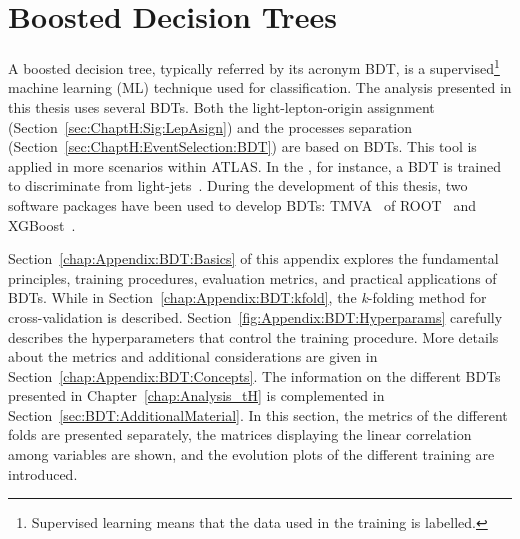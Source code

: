 \chapter{Boosted Decision Trees}
\label{chap:Appendix:BDT}



A boosted decision tree, typically referred by its acronym BDT, is a supervised\footnote{Supervised learning means that the 
data used in the training is labelled.} machine learning (ML) technique used for classification. The analysis presented in this thesis 
uses several BDTs. Both the light-lepton-origin assignment (Section~\ref{sec:ChaptH:Sig:LepAsign}) and the processes
separation (Section~\ref{sec:ChaptH:EventSelection:BDT}) are based on BDTs. This tool is applied in more scenarios 
within ATLAS. In the \btag, for instance, a BDT is trained to discriminate \bjets from light-jets~\cite{ATLAS:2019bwq}. 
During the development of this thesis, two software packages have been used to develop BDTs: TMVA~\cite{TMVAUsersGuide} of ROOT~\cite{Brun:1997pa}
and XGBoost~\cite{Chen_2016}.

Section~\ref{chap:Appendix:BDT:Basics} of this appendix explores the fundamental principles, training procedures, 
evaluation metrics, and practical applications of BDTs. While in Section~\ref{chap:Appendix:BDT:kfold}, the \textit{k}-folding
method for cross-validation is described. Section~\ref{fig:Appendix:BDT:Hyperparams} carefully describes the
hyperparameters that control the training procedure. More details about the metrics and additional considerations
are given in Section~\ref{chap:Appendix:BDT:Concepts}.
The information on the different BDTs presented in Chapter~\ref{chap:Analysis_tH} is complemented in 
Section~\ref{sec:BDT:AdditionalMaterial}. In this section, the metrics of the different folds are presented
separately, the matrices displaying the linear correlation among variables are shown, and the evolution plots
of the different training are introduced.



